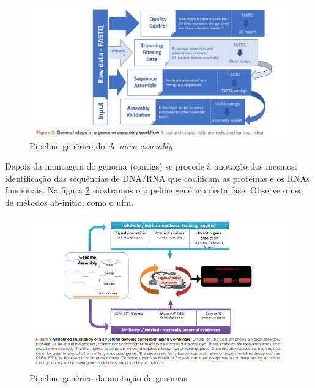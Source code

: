 \documentclass[12pt]{article}
\begin{document}
\begin{itemize}
\begin{enumerate}
                    \begin{figure}[h!]
                        \centering
                        \includegraphics[scale=0.65]{./figuras/pipeline_assembly}
                        \caption{Pipeline genérico do {\it{de novo assembly}}}
                        \label{fig:assembly}
                    \end{figure}

                    Depois da montagem do genoma (contigs) se procede à anotação dos mesmos: identificação das sequências de DNA/RNA que codificam as proteínas e os RNAs funcionais. Na figura \ref{fig:annotation} mostramos o pipeline genérico desta fase. Observe o uso de métodos ab-initio, como o \gls{ufm}.

                    \begin{figure}[h!]
                        \centering
                        \includegraphics[scale=0.85]{./figuras/pipeline_annotation}
                        \caption{Pipeline genérico da anotação  de genomas}
                        \label{fig:annotation}
                    \end{figure}



\end{enumerate}
\end{itemize}
\end{document}
